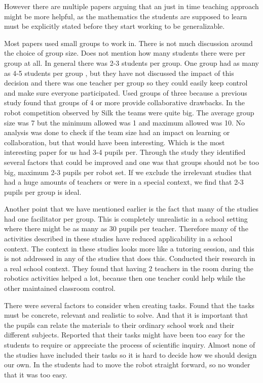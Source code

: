 \bigskip\noindent
However there are multiple papers arguing that an just in time teaching approach might be more helpful, as the mathematics the students are supposed to learn must be explicitly stated before they start working to be generalizable. 

\bigskip\noindent
Most papers used small groups to work in. There is not much discussion around the choice of group size. \cite{nugent2008effect} Does not mention how many students there were per group at all. In general there was 2-3 students per group\cite{mitnik2009collaborative, norton2004using, lindh2007does, silk2011resources, nugent2009use, williams2007acquisition}. One group had as many as 4-5 students per group \cite{barker2007robotics}, but they have not discussed the impact of this decision and there was one teacher per group so they could easily keep control and make sure everyone participated. \cite{mitnik2009collaborative} Used groups of three because a previous study found that groups of 4 or more provide collaborative drawbacks. In the robot competition observed by Silk \cite{silk2011resources} the teams were quite big. The average group size was 7 but the minimum allowed was 1 and maximum allowed was 10. No analysis was done to check if the team size had an impact on learning or collaboration, but that would have been interesting. \cite{lindh2007does} Which is the most interesting paper for us had 3-4 pupils per. Through the study they identified several factors that could be improved and one was that groups should not be too big, maximum 2-3 pupils per robot set. If we exclude the irrelevant studies that had a huge amounts of teachers or were in a special context, we find that 2-3 pupils per group is ideal.

\bigskip\noindent
Another point that we have mentioned earlier is the fact that many of the studies had one facilitator per group. This is completely unrealistic in a school setting where there might be as many as 30 pupils per teacher. Therefore many of the activities described in these studies have reduced applicability in a school context. The context in these studies looks more like a tutoring session, and this is not addressed in any of the studies that does this. \cite{lindh2007does} Conducted their research in a real school context. They found that having 2 teachers in the room during the robotics activities helped a lot, because then one teacher could help while the other maintained classroom control.

\bigskip\noindent
There were several factors to consider when creating tasks. \cite{lindh2007does} Found that the tasks must be concrete, relevant and realistic  to solve. And that it is important that the pupils can relate the materials to their ordinary school work and their different subjects. \cite{williams2007acquisition} Reported that their tasks might have been too easy for the students to require or appreciate the process of  scientific inquiry. Almost none of the studies have included their tasks so it is hard to decide how we should design our own. In \cite{williams2007acquisition} the students had to move the robot straight forward, so no wonder that it was too easy.


